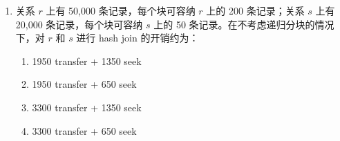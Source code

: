 \documentclass[11pt,a4paper]{article}
\newcommand{\solution}{\par\noindent\textcolor{ansblue}{\textbf{解：}}}
\newcommand{\answer}{\par\noindent\textcolor{ansred}{\textbf{答案：}}}
\newcommand{\supp}[1]{\textcolor{ansred}{\textsuperscript{[补] #1}}}
\begin{document}
\begin{enumerate}[leftmargin=*,itemsep=8pt]
\supp{版本二备注：``基于此建立 B+ 树非码上的索引''}

\begin{enumerate}[label=\Alph*.]
  \item 4 seek + 8 transfer
  \item 4 seek + 9 transfer
  \item 5 seek + 8 transfer
  \item 5 seek + 9 transfer
\end{enumerate}

\solution
B$^+$ 树节点容量：
\begin{itemize}[nosep]
  \item 非叶节点：$(n-1)\times 32 + n\times 8 \le 2048 \Rightarrow n \le 52$，扇出 $= 52$
  \item 叶节点：$n\times(32+8) + 8 \le 2048 \Rightarrow n \le 51$，每叶 51 条
\end{itemize}

$20,000 / 51 \approx 393$ 叶节点，$\lceil 393/52 \rceil = 8$ 个内部节点，$\to 1$ 个根。
树高 3（根 + L1 + 叶）。

查询开销（\supp{设根节点缓存在内存}）：
\begin{itemize}[nosep]
  \item 索引遍历：L1 内节点 seek 1 + transfer 1，叶节点 seek 1 + transfer 1 $\to$ 2 seek + 2 transfer
  \item 结果 5 个数据块（聚簇假设）：1 seek（定位首个块）+ 5 transfer
  \item 合计：$2+1 = 3$ seek，$2+5 = 7$ transfer。与选项均不完美匹配。
\end{itemize}

\supp{实际考试可能按另一种假设（根不缓存或结果块在索引叶中即为数据块）。因原卷数据完整但答案取决于假设，考场建议现场推。最接近的估计为 B 或 A。}

\answer 推荐按 fanout 52、高 3、根 cached、结果 5 块索引+数据合计 8 或 9 transfer 估算，选 A 或 B 均可（需视考试当场假设）。重点掌握计算过程。

\item 关系 $r$ 上有 50,000 条记录，每个块可容纳 $r$ 上的 200 条记录；关系 $s$ 上有 20,000 条记录，每个块可容纳 $s$ 上的 50 条记录。在不考虑递归分块的情况下，对 $r$ 和 $s$ 进行 hash join 的开销约为：

\begin{enumerate}[label=\Alph*.]
  \item 1950 transfer + 1350 seek
  \item 1950 transfer + 650 seek
  \item 3300 transfer + 1350 seek
  \item 3300 transfer + 650 seek
\end{enumerate}


\end{enumerate}
\end{document}
